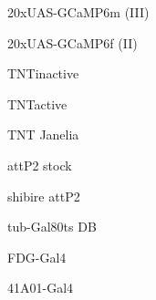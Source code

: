 \documentclass[17pt]{extarticle}
\begin{document}
\footnotesize
\newpage\vspace*{-0.15cm}
\begin{footnotesize}
20xUAS-GCaMP6m (III) \\[0.5em]
\end{footnotesize}
\footnotesize
\newpage\vspace*{-0.15cm}
\begin{footnotesize}
20xUAS-GCaMP6f (II) \\[0.5em]
\end{footnotesize}
\footnotesize
\newpage\vspace*{-0.15cm}
\begin{normalsize}
TNTinactive \\[0.5em]
\end{normalsize}
\footnotesize
\newpage\vspace*{-0.15cm}
\begin{large}
TNTactive \\[0.5em]
\end{large}
\footnotesize
\newpage\vspace*{-0.15cm}
\begin{normalsize}
TNT Janelia \\[0.5em]
\end{normalsize}
\footnotesize
\newpage\vspace*{-0.15cm}
\begin{normalsize}
attP2 stock \\[0.5em]
\end{normalsize}
\footnotesize
\newpage\vspace*{-0.15cm}
\begin{normalsize}
shibire attP2 \\[0.5em]
\end{normalsize}
\footnotesize
\newpage\vspace*{-0.15cm}
\begin{normalsize}
tub-Gal80ts DB \\[0.5em]
\end{normalsize}
\footnotesize
\newpage\vspace*{-0.15cm}
\begin{large}
FDG-Gal4 \\[0.5em]
\end{large}
\footnotesize
\newpage\vspace*{-0.15cm}
\begin{large}
41A01-Gal4 \\[0.5em]
\end{large}
\footnotesize
\newpage\vspace*{-0.15cm}
\end{document}
